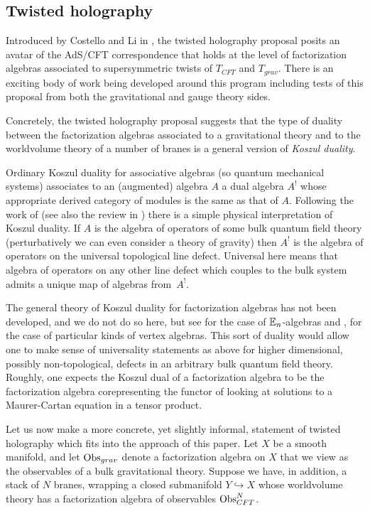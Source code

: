 \subsection{Twisted holography}
Introduced by Costello and Li in \cite{CLsugra}, the twisted holography proposal posits an avatar of the AdS/CFT correspondence that holds at the level of factorization algebras associated to supersymmetric twists of $T_{CFT}$ and $T_{grav}$. There is an exciting body of work being developed around this program including tests of this proposal from both the gravitational and gauge theory sides.

\parsec{}
Concretely, the twisted holography proposal suggests that the type of duality between the factorization algebras associated to a gravitational theory and to the worldvolume theory of a number of branes is a general version of \textit{Koszul duality}.

Ordinary Koszul duality for associative algebras (so quantum mechanical systems) associates to an (augmented) algebra $A$ a dual algebra $A^!$ whose appropriate derived category of modules is the same as that of $A$.
Following the work of \cite{CLsugra, Costello_2021, CostelloM2} (see also the review in \cite{PWkoszul}) there is a simple physical interpretation of Koszul duality.
If $A$ is the algebra of operators of some bulk quantum field theory (perturbatively we can even consider a theory of gravity) then $A^!$ is the algebra of operators on the universal topological line defect.
Universal here means that algebra of operators on any other line defect which couples to the bulk system admits a unique map of algebras from~$A^!$.

The general theory of Koszul duality for factorization algebras has not been developed, and we do not do so here, but see \cite{LurieHA} for the case of $\mathbb{E}_n$-algebras and  \cite{gui2022quadratic}, \cite{tamarkin2003deformations} for the case of particular kinds of vertex algebras. This sort of duality would allow one to make sense of universality statements as above for higher dimensional, possibly non-topological, defects in an arbitrary bulk quantum field theory. Roughly, one expects the Koszul dual of a factorization algebra to be the factorization algebra corepresenting the functor of looking at solutions to a Maurer-Cartan equation in a tensor product. 

\parsec{}
Let us now make a more concrete, yet slightly informal, statement of twisted holography which fits into the approach of this paper. Let $X$ be a smooth manifold, and let $\operatorname{Obs}_{grav}$ denote a factorization algebra on $X$ that we view as the observables of a bulk gravitational theory. Suppose we have, in addition, a stack of $N$ branes, wrapping a closed submanifold $Y\hookrightarrow X$ whose worldvolume theory has a factorization algebra of observables $\operatorname{Obs}_{CFT}^N$. 

